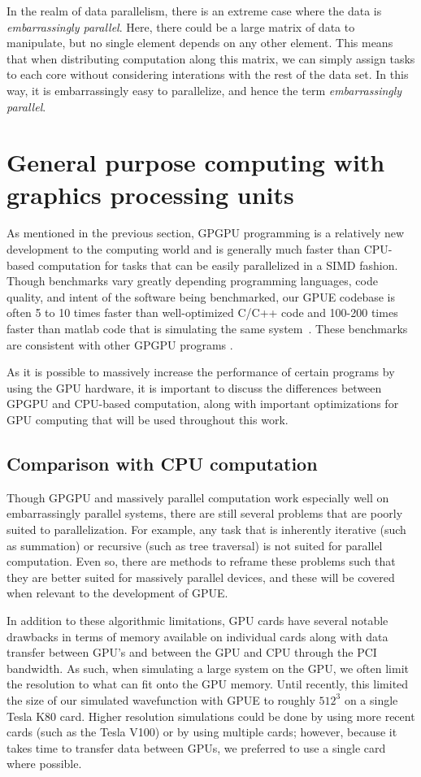 In the realm of data parallelism, there is an extreme case where the data is \textit{embarrassingly parallel}.
Here, there could be a large matrix of data to manipulate, but no single element depends on any other element.
This means that when distributing computation along this matrix, we can simply assign tasks to each core without considering interations with the rest of the data set.
In this way, it is embarrassingly easy to parallelize, and hence the term \textit{embarrassingly parallel}.

\section{General purpose computing with graphics processing units}


As mentioned in the previous section, GPGPU programming is a relatively new development to the computing world and is generally much faster than CPU-based computation for tasks that can be easily parallelized in a SIMD fashion.
Though benchmarks vary greatly depending programming languages, code quality, and intent of the software being benchmarked, our GPUE codebase is often 5 to 10 times faster than well-optimized C/C++ code and 100-200 times faster than matlab code that is simulating the same system~\cite{wittek2016}.
These benchmarks are consistent with other GPGPU programs .

As it is possible to massively increase the performance of certain programs by using the GPU hardware, it is important to discuss the differences between GPGPU and CPU-based computation, along with important optimizations for GPU computing that will be used throughout this work.

\subsection{Comparison with CPU computation}

Though GPGPU and massively parallel computation work especially well on embarrassingly parallel systems, there are still several problems that are poorly suited to parallelization.
For example, any task that is inherently iterative (such as summation) or recursive (such as tree traversal) is not suited for parallel computation.
Even so, there are methods to reframe these problems such that they are better suited for massively parallel devices, and these will be covered when relevant to the development of GPUE.

In addition to these algorithmic limitations, GPU cards have several notable drawbacks in terms of memory available on individual cards along with data transfer between GPU's and between the GPU and CPU through the PCI bandwidth.
As such, when simulating a large system on the GPU, we often limit the resolution to what can fit onto the GPU memory.
Until recently, this limited the size of our simulated wavefunction with GPUE to roughly $512^3$ on a single Tesla K80 card.
Higher resolution simulations could be done by using more recent cards (such as the Tesla V100) or by using multiple cards; however, because it takes time to transfer data between GPUs, we preferred to use a single card where possible.

